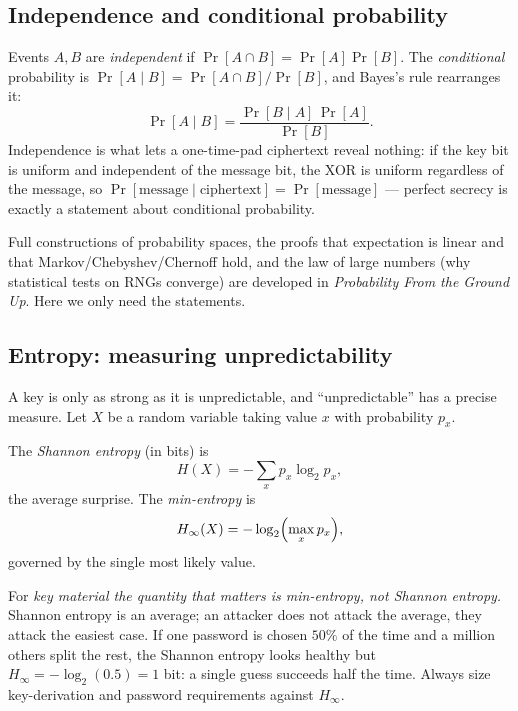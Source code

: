 \subsection{Independence and conditional probability}
\label{ch41:indep}

Events $A,B$ are \emph{independent} if $\Pr[A\cap B]=\Pr[A]\Pr[B]$. The
\emph{conditional} probability is $\Pr[A\mid B]=\Pr[A\cap B]/\Pr[B]$, and Bayes's
rule rearranges it:
\[
\Pr[A\mid B] = \frac{\Pr[B\mid A]\,\Pr[A]}{\Pr[B]}.
\]
Independence is what lets a one-time-pad ciphertext reveal nothing: if the key bit
is uniform and independent of the message bit, the XOR is uniform regardless of the
message, so $\Pr[\text{message}\mid\text{ciphertext}]=\Pr[\text{message}]$ ---
perfect secrecy is exactly a statement about conditional probability.

\begin{connectionbox}
Full constructions of probability spaces, the proofs that expectation is linear and
that Markov/Chebyshev/Chernoff hold, and the law of large numbers (why statistical
tests on RNGs converge) are developed in \emph{Probability From the Ground Up}.
Here we only need the statements.
\end{connectionbox}

\subsection{Entropy: measuring unpredictability}
\label{ch41:entropy}

A key is only as strong as it is unpredictable, and ``unpredictable'' has a precise
measure. Let $X$ be a random variable taking value $x$ with probability $p_x$.

\begin{definition}
\label{ch41:def-entropy}
The \emph{Shannon entropy} (in bits) is
\[
H(X) = -\sum_x p_x \log_2 p_x,
\]
the average surprise. The \emph{min-entropy} is
\[
H_\infty(X) = -\log_2\Bigl(\max_x p_x\Bigr),
\]
governed by the single most likely value.
\end{definition}

\begin{trapbox}
For \emph{key material the quantity that matters is min-entropy, not Shannon
entropy.} Shannon entropy is an average; an attacker does not attack the average,
they attack the easiest case. If one password is chosen $50\%$ of the time and a
million others split the rest, the Shannon entropy looks healthy but
$H_\infty = -\log_2(0.5)=1$ bit: a single guess succeeds half the time. Always
size key-derivation and password requirements against $H_\infty$.
\end{trapbox}


